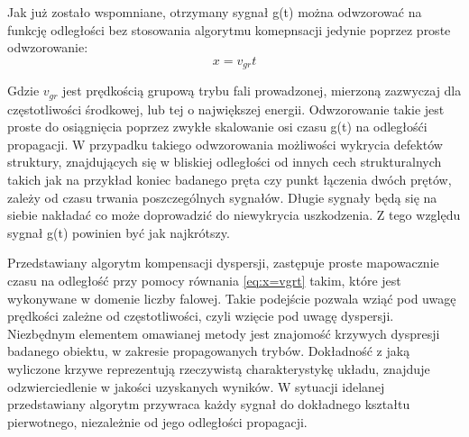 Jak już zostało wspomniane, otrzymany sygnał g(t) można odwzorować na funkcję odległości bez stosowania algorytmu komepnsacji jedynie poprzez proste odwzorowanie:
\begin{equation}
x=v_{gr}t \label{eq:x=vgrt}
\end{equation}

Gdzie $v_{gr}$ jest prędkością grupową trybu fali prowadzonej, mierzoną zazwyczaj dla częstotliwości środkowej, lub tej o największej energii. Odwzorowanie takie jest proste do osiągnięcia poprzez zwykłe skalowanie osi czasu g(t) na odległośći propagacji. W przypadku takiego odwzorowania możliwości wykrycia defektów struktury, znajdujących się w bliskiej odległości od innych cech strukturalnych takich jak na przykład koniec badanego pręta czy punkt łączenia dwóch prętów, zależy od czasu trwania poszczególnych sygnałów. Długie sygnały będą się na siebie nakładać co może doprowadzić do niewykrycia uszkodzenia. Z tego względu sygnał g(t) powinien być jak najkrótszy. 

Przedstawiany algorytm kompensacji dyspersji, zastępuje proste mapowacznie czasu na odległość przy pomocy równania \ref{eq:x=vgrt} takim, które jest wykonywane w domenie liczby falowej. Takie podejście pozwala wziąć pod uwagę prędkości zależne od częstotliwości, czyli wzięcie pod uwagę dyspersji. Niezbędnym elementem omawianej metody jest znajomość krzywych dyspresji badanego obiektu, w zakresie propagowanych trybów. Dokładność z jaką wyliczone krzywe reprezentują rzeczywistą charakterystykę układu, znajduje odzwierciedlenie w jakości uzyskanych wyników. W sytuacji idelanej przedstawiany algorytm przywraca każdy sygnał do dokładnego kształtu pierwotnego, niezależnie od jego odległości propagacji.  


